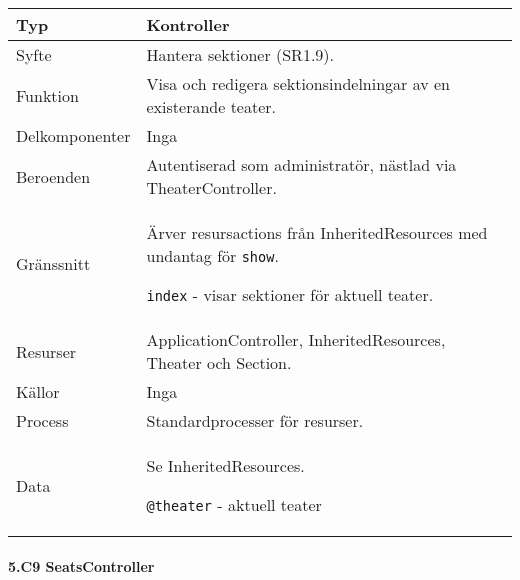\documentclass[a4paper, twoside, 11pt, titlepage]{article}
\begin{document}
			\begin {table} [ht] \begin{tabular} {  p{3.5cm} p{9.6cm} }
				\hline
				{Typ} & {Kontroller} \\
				\hline
				{Syfte} & {Hantera sektioner (SR1.9).} \\
				\hline
				{Funktion} & {Visa och redigera sektionsindelningar av en existerande teater.} \\
				\hline
				{Delkomponenter} & {Inga} \\
				\hline
				{Beroenden} & {Autentiserad som administratör, nästlad via TheaterController.} \\
				\hline
				{Gränssnitt} & {Ärver resursactions från InheritedResources med undantag för {\tt show}.

{\tt index} - visar sektioner för aktuell teater.} \\
				\hline
				{Resurser} & {ApplicationController, InheritedResources, Theater och Section.} \\
				\hline
				{Källor} & {Inga} \\
				\hline
				{Process} & {Standardprocesser för resurser.} \\
				\hline
				{Data} & {Se InheritedResources.

{\tt @theater} - aktuell teater} \\
				\hline
			\end{tabular} \end{table} \FloatBarrier


			\paragraph{5.C9 SeatsController}\
\end{document}
